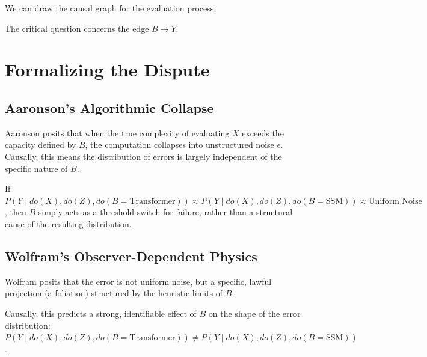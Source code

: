 \documentclass[12pt,a4paper]{article}
\begin{document}
We can draw the causal graph for the evaluation process:

\begin{center}
\end{center}

The critical question concerns the edge $B \to Y$.

\section{Formalizing the Dispute}

\subsection{Aaronson's Algorithmic Collapse}

Aaronson posits that when the true complexity of evaluating $X$ exceeds the capacity defined by $B$, the computation collapses into unstructured noise $\epsilon$. Causally, this means the distribution of errors is largely independent of the specific nature of $B$.

If $P(Y \mid do(X), do(Z), do(B = \text{Transformer})) \approx P(Y \mid do(X), do(Z), do(B = \text{SSM})) \approx \text{Uniform Noise}$, then $B$ simply acts as a threshold switch for failure, rather than a structural cause of the resulting distribution.

\subsection{Wolfram's Observer-Dependent Physics}

Wolfram posits that the error is not uniform noise, but a specific, lawful projection (a foliation) structured by the heuristic limits of $B$.

Causally, this predicts a strong, identifiable effect of $B$ on the shape of the error distribution:
$P(Y \mid do(X), do(Z), do(B = \text{Transformer})) \neq P(Y \mid do(X), do(Z), do(B = \text{SSM}))$.
\end{document}
